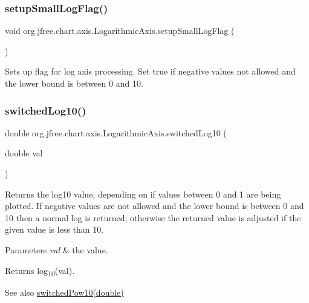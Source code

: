 \subsubsection{\texorpdfstring{setup\+Small\+Log\+Flag()}{setupSmallLogFlag()}}
{\footnotesize\ttfamily void org.\+jfree.\+chart.\+axis.\+Logarithmic\+Axis.\+setup\+Small\+Log\+Flag (\begin{DoxyParamCaption}{ }\end{DoxyParamCaption})\hspace{0.3cm}{\ttfamily [protected]}}

Sets up flag for log axis processing. Set true if negative values not allowed and the lower bound is between 0 and 10. \mbox{\label{classorg_1_1jfree_1_1chart_1_1axis_1_1_logarithmic_axis_adde2b61e7573af7c9cdf86b65a64c50d}} 
\subsubsection{\texorpdfstring{switched\+Log10()}{switchedLog10()}}
{\footnotesize\ttfamily double org.\+jfree.\+chart.\+axis.\+Logarithmic\+Axis.\+switched\+Log10 (\begin{DoxyParamCaption}\item[{double}]{val }\end{DoxyParamCaption})\hspace{0.3cm}{\ttfamily [protected]}}

Returns the log10 value, depending on if values between 0 and 1 are being plotted. If negative values are not allowed and the lower bound is between 0 and 10 then a normal log is returned; otherwise the returned value is adjusted if the given value is less than 10.


\begin{DoxyParams}{Parameters}
{\em val} & the value.\\
\hline
\end{DoxyParams}
\begin{DoxyReturn}{Returns}
log\textsubscript{10}(val).
\end{DoxyReturn}
\begin{DoxySeeAlso}{See also}
\mbox{\hyperlink{classorg_1_1jfree_1_1chart_1_1axis_1_1_logarithmic_axis_a1c3f372e3a43658a030bcf4f9d915743}{switched\+Pow10(double)}} 
\end{DoxySeeAlso}
\mbox{\label{classorg_1_1jfree_1_1chart_1_1axis_1_1_logarithmic_axis_a1c3f372e3a43658a030bcf4f9d915743}} 

